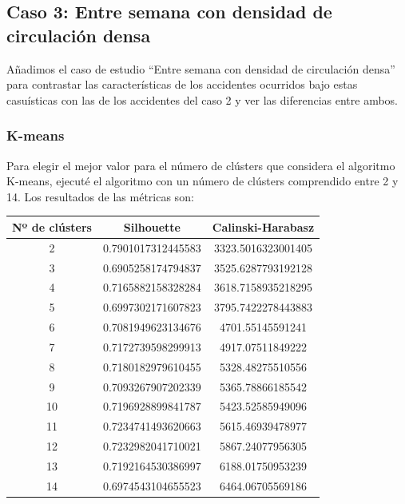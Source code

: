 \documentclass[a4]{article}
\begin{document}
\newpage

\subsection{Caso 3: Entre semana con densidad de circulación densa}

Añadimos el caso de estudio ``Entre semana con densidad de circulación densa'' para contrastar las características de los accidentes ocurridos bajo estas casuísticas con las de los accidentes del caso 2 y ver las diferencias entre ambos.

\subsubsection{K-means}

Para elegir el mejor valor para el número de clústers que considera el algoritmo K-means, ejecuté el algoritmo con un número de clústers comprendido entre 2 y 14. Los resultados de las métricas son:

\begin{center}
\begin{tabular}{|c|c|c|}
\hline
\multicolumn{1}{|c|}{\textbf{Nº de clústers}}& \textbf{Silhouette} & \textbf{Calinski-Harabasz}\\ \hline
  2  & 0.7901017312445583 & 3323.5016323001405 \\ \hline
  3  & 0.6905258174794837 & 3525.6287793192128 \\ \hline
  4  & 0.7165882158328284 & 3618.7158935218295 \\ \hline
  5  & 0.6997302171607823 & 3795.7422278443883 \\ \hline
  6  & 0.7081949623134676 & 4701.55145591241   \\ \hline
  7  & 0.7172739598299913 & 4917.07511849222   \\ \hline
  8  & 0.7180182979610455 & 5328.48275510556   \\ \hline
  9  & 0.7093267907202339 & 5365.78866185542   \\ \hline
 10  & 0.7196928899841787 & 5423.52585949096   \\ \hline
 11  & 0.7234741493620663 & 5615.46939478977   \\ \hline
 12  & 0.7232982041710021 & 5867.24077956305   \\ \hline
 13  & 0.7192164530386997 & 6188.01750953239   \\ \hline
 14  & 0.6974543104655523 & 6464.06705569186   \\ \hline
\end{tabular}
\end{center}
\end{document}
